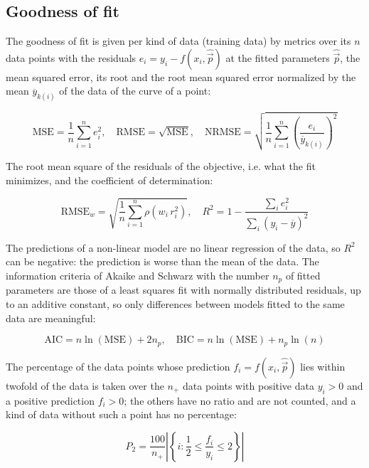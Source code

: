 \documentclass{article}
\begin{document}
\subsection{Goodness of fit}

The goodness of fit is given per kind of data (training data) by metrics over its $n$ data points with the residuals $e_i = y_i - f(x_i, \hat{\vec{p}})$ at the fitted parameters $\hat{\vec{p}}$, the mean squared error, its root and the root mean squared error normalized by the mean $\overline{y}_{k(i)}$ of the data of the curve of a point:

\begin{equation}
\mathrm{MSE} = \frac{1}{n} \sum_{i=1}^{n} e_i^2, \quad \mathrm{RMSE} = \sqrt{\mathrm{MSE}}, \quad \mathrm{NRMSE} = \sqrt{\frac{1}{n} \sum_{i=1}^{n} \left(\frac{e_i}{\overline{y}_{k(i)}}\right)^2}
\end{equation}

The root mean square of the residuals of the objective, i.e. what the fit minimizes, and the coefficient of determination:

\begin{equation}
\mathrm{RMSE}_w = \sqrt{\frac{1}{n} \sum_{i=1}^{n} \rho\left(w_i\, r_i^2\right)}, \quad R^2 = 1 - \frac{\sum_{i} e_i^2}{\sum_{i} \left(y_i - \overline{y}\right)^2}
\end{equation}

The predictions of a non-linear model are no linear regression of the data, so $R^2$ can be negative: the prediction is worse than the mean of the data. The information criteria of Akaike \cite{Akaike1974} and Schwarz \cite{Schwarz1978} with the number $n_p$ of fitted parameters are those of a least squares fit with normally distributed residuals, up to an additive constant, so only differences between models fitted to the same data are meaningful:

\begin{equation}
\mathrm{AIC} = n \ln(\mathrm{MSE}) + 2 n_p, \quad \mathrm{BIC} = n \ln(\mathrm{MSE}) + n_p \ln(n)
\end{equation}

The percentage of the data points whose prediction $f_i = f(x_i, \hat{\vec{p}})$ lies within twofold of the data is taken over the $n_+$ data points with positive data $y_i > 0$ and a positive prediction $f_i > 0$; the others have no ratio and are not counted, and a kind of data without such a point has no percentage:

\begin{equation}
P_2 = \frac{100}{n_+} \left|\left\{ i : \frac{1}{2} \le \frac{f_i}{y_i} \le 2 \right\}\right|
\end{equation}
\end{document}

